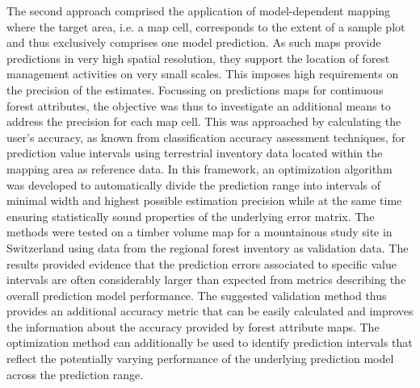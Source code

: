 The second approach comprised the application of model-dependent mapping where the target area, i.e. a map cell, corresponds to the extent of a sample plot and thus exclusively comprises one model prediction.
As such maps provide predictions in very high spatial resolution, they support the location of forest management activities on very small scales. This imposes high requirements on the precision of the estimates. Focussing on predictions maps for continuous forest attributes, the objective was thus to investigate an additional means to address the precision for each map cell. This was approached by calculating the user's accuracy, as known from classification accuracy assessment techniques, for prediction value intervals using terrestrial inventory data located within the mapping area as reference data. In this framework, an optimization algorithm was developed to automatically divide the prediction range into intervals of minimal width and highest possible estimation precision while at the same time ensuring statistically sound properties of the underlying error matrix. The methods were tested on a timber volume map for a mountainous study site in Switzerland using data from the regional forest inventory as validation data. The results provided evidence that the prediction errors associated to specific value intervals are often considerably larger than expected from metrics describing the overall prediction model performance. The suggested validation method thus provides an additional accuracy metric that can be easily calculated and improves the information about the accuracy provided by forest attribute maps. The optimization method can additionally be used to identify prediction intervals that reflect the potentially varying performance of the underlying prediction model across the prediction range.